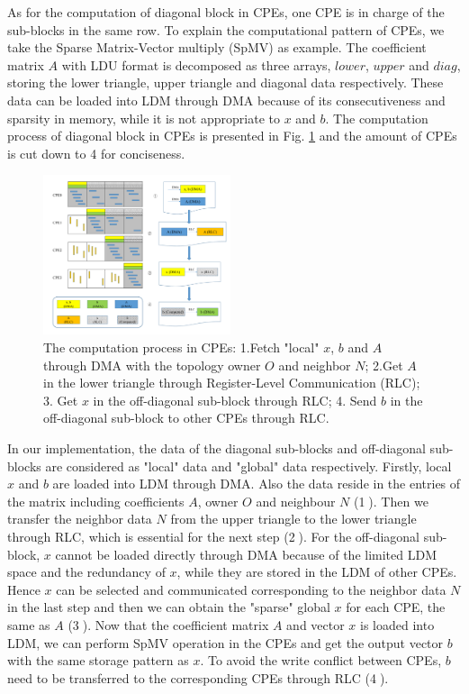 \documentclass[conference]{IEEEtran}
\begin{document}
As for the computation of diagonal block in CPEs, one CPE is in charge of the sub-blocks in the same row. To explain the computational pattern of CPEs, we take the Sparse Matrix-Vector multiply (SpMV) as example. The coefficient matrix $A$ with LDU format is decomposed as three arrays, $lower$, $upper$ and $diag$, storing the lower triangle, upper triangle and diagonal data respectively. These data can be loaded into LDM through DMA because of its consecutiveness and sparsity in memory, while it is not appropriate to $x$ and $b$. The computation process of diagonal block in CPEs is presented in Fig. \ref{rlc} and the amount of CPEs is cut down to 4 for conciseness.
\begin{figure}[tbp]
\centerline{\includegraphics[width=0.49\textwidth]{rlc.pdf}}
\caption{The computation process in CPEs: 1.Fetch "local" $x$, $b$ and $A$ through DMA with the topology owner $O$ and neighbor $N$; 2.Get $A$ in the lower triangle through Register-Level Communication (RLC); 3. Get $x$ in the off-diagonal sub-block through RLC; 4. Send $b$ in the off-diagonal sub-block to other CPEs through RLC.}
\label{rlc}
\end{figure}
In our implementation, the data of the diagonal sub-blocks and off-diagonal sub-blocks are considered as "local" data and "global" data respectively. Firstly, local $x$ and $b$ are loaded into LDM through DMA. Also the data reside in the entries of the matrix including coefficients $A$, owner $O$ and neighbour $N$ (\textcircled{1}). Then we transfer the neighbor data $N$ from the upper triangle to the lower triangle through RLC, which is essential for the next step (\textcircled{2}). For the off-diagonal sub-block, $x$ cannot be loaded directly through DMA because of the limited LDM space and the redundancy of $x$, while they are stored in the LDM of other CPEs. Hence $x$ can be selected and communicated corresponding to the neighbor data $N$ in the last step and then we can obtain the "sparse" global $x$ for each CPE, the same as $A$ (\textcircled{3}). Now that the coefficient matrix $A$ and vector $x$ is loaded into LDM, we can perform SpMV operation in the CPEs and get the output vector $b$ with the same storage pattern as $x$. To avoid the write conflict between CPEs, $b$ need to be transferred to the corresponding CPEs through RLC (\textcircled{4}).
\end{document}
